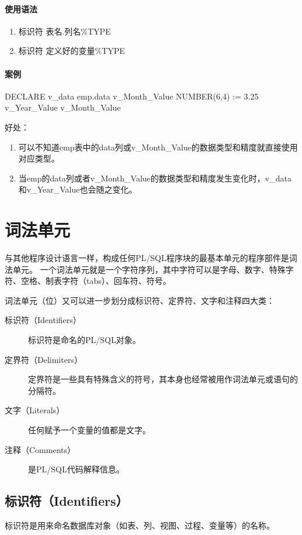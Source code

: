 \documentclass[11pt, a4paper, oneside, UTF8]{ctexbook}
\begin{document}
\subsubsection{使用语法}
\begin{enumerate}
  \item 标识符 表名.列名\%TYPE
  \item 标识符 定义好的变量\%TYPE
\end{enumerate}
\subsubsection{案例}
\begin{plsql}
DECLARE
  v_data emp.data%
  v_Month_Value NUMBER(6,4) := 3.25
  v_Year_Value v_Month_Value%
\end{plsql}
好处：
\begin{enumerate}
  \item 可以不知道emp表中的data列或v\_Month\_Value的数据类型和精度就直接使用对应类型。
  \item 当emp的data列或者v\_Month\_Value的数据类型和精度发生变化时，v\_data和v\_Year\_Value也会随之变化。
\end{enumerate}

\chapter{词法单元}
与其他程序设计语言一样，构成任何PL/SQL程序块的最基本单元的程序部件是词法单元。
一个词法单元就是一个字符序列，其中字符可以是字母、数字、特殊字符、空格、制表字符（tabs）、回车符、符号。

词法单元（位）又可以进一步划分成标识符、定界符、文字和注释四大类：
\begin{description}
  \item[标识符（Identifiers）] 标识符是命名的PL/SQL对象。
  \item[定界符（Delimiters）] 定界符是一些具有特殊含义的符号，其本身也经常被用作词法单元或语句的分隔符。
  \item[文字（Literals）] 任何赋予一个变量的值都是文字。
  \item[注释（Comments）] 是PL/SQL代码解释信息。
\end{description}

\section{标识符（Identifiers）}
标识符是用来命名数据库对象（如表、列、视图、过程、变量等）的名称。
\end{document}
